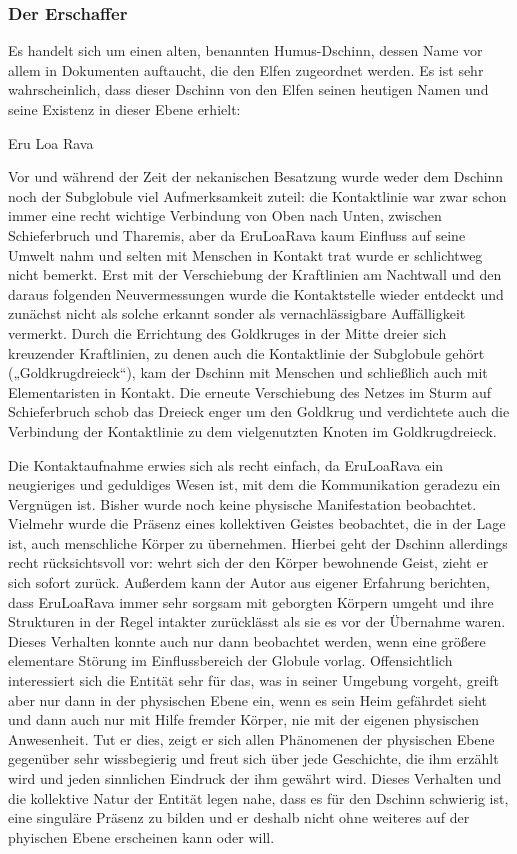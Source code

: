 \documentclass[a5paper,8pt]{book}
\begin{document}
\newpage

\subsubsection{Der Erschaffer}
Es handelt sich um einen alten, benannten Humus-Dschinn, dessen Name vor allem in Dokumenten auftaucht, die den Elfen 
zugeordnet werden. Es ist sehr wahrscheinlich, dass dieser Dschinn von den Elfen seinen heutigen Namen und seine Existenz 
in dieser Ebene erhielt: 

Eru Loa Rava

Vor und während der Zeit der nekanischen Besatzung wurde weder dem Dschinn noch der Subglobule viel Aufmerksamkeit zuteil: 
die Kontaktlinie war zwar schon immer eine recht wichtige Verbindung von Oben nach Unten, zwischen Schieferbruch und 
Tharemis, aber da EruLoaRava kaum Einfluss auf seine Umwelt nahm und selten mit Menschen in Kontakt trat wurde er 
schlichtweg nicht bemerkt. Erst mit der Verschiebung der Kraftlinien am Nachtwall und den daraus folgenden Neuvermessungen 
wurde die Kontaktstelle wieder entdeckt und zunächst nicht als solche erkannt sonder als vernachlässigbare Auffälligkeit 
vermerkt. Durch die Errichtung des Goldkruges in der Mitte dreier sich kreuzender Kraftlinien, zu denen auch die 
Kontaktlinie der Subglobule gehört („Goldkrugdreieck“), kam der Dschinn mit Menschen und schließlich auch mit 
Elementaristen in Kontakt. Die erneute Verschiebung des Netzes im Sturm auf Schieferbruch schob das Dreieck enger um den 
Goldkrug und verdichtete auch die Verbindung der Kontaktlinie zu dem vielgenutzten Knoten im Goldkrugdreieck. 

Die Kontaktaufnahme erwies sich als recht einfach, da EruLoaRava ein neugieriges und geduldiges Wesen ist, mit dem die 
Kommunikation geradezu ein Vergnügen ist. Bisher wurde noch keine physische Manifestation beobachtet. Vielmehr wurde die 
Präsenz eines kollektiven Geistes beobachtet, die in der Lage ist, auch menschliche Körper zu übernehmen. Hierbei geht der 
Dschinn allerdings recht rücksichtsvoll vor: wehrt sich der den Körper bewohnende Geist, zieht er sich sofort zurück. 
Außerdem kann der Autor aus eigener Erfahrung berichten, dass EruLoaRava immer sehr sorgsam mit geborgten Körpern umgeht 
und ihre Strukturen in der Regel intakter zurücklässt als sie es vor der Übernahme waren. Dieses Verhalten konnte auch nur 
dann beobachtet werden, wenn eine größere elementare Störung im Einflussbereich der Globule vorlag. Offensichtlich 
interessiert sich die Entität sehr für das, was in seiner Umgebung vorgeht, greift aber nur dann in der physischen Ebene 
ein, wenn es sein Heim gefährdet sieht und dann auch nur mit Hilfe fremder Körper, nie mit der eigenen physischen 
Anwesenheit. Tut er dies, zeigt er sich allen Phänomenen der physischen Ebene gegenüber sehr wissbegierig und freut sich 
über jede Geschichte, die ihm erzählt wird und jeden sinnlichen Eindruck der ihm gewährt wird. Dieses Verhalten und die 
kollektive Natur der Entität legen nahe, dass es für den Dschinn schwierig ist, eine singuläre Präsenz zu bilden und er 
deshalb nicht ohne weiteres auf der phyischen Ebene erscheinen kann oder will. 
\end{document}
